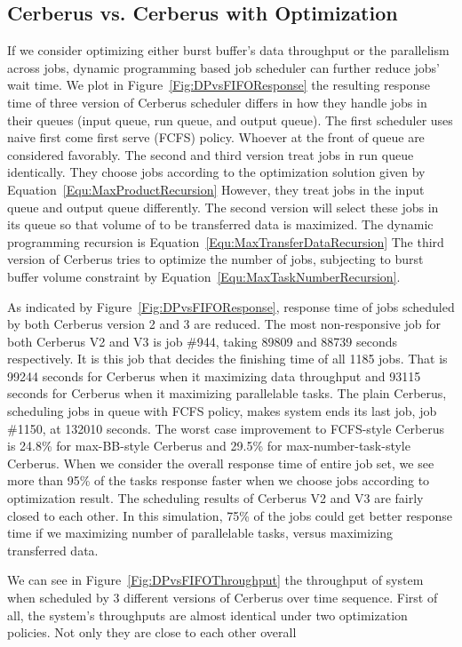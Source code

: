 \subsection{Cerberus vs. Cerberus with Optimization}
If we consider optimizing either burst buffer's data throughput or the parallelism across jobs,
dynamic programming based job scheduler can further reduce jobs' wait time.
We plot in Figure~\ref{Fig:DPvsFIFOResponse} the resulting response time of
three version of Cerberus scheduler differs in
how they handle jobs in their queues (input queue, run queue, and output queue).
The first scheduler uses naive first come first serve (FCFS) policy.
Whoever at the front of queue are considered favorably.
The second and third version treat jobs in run queue identically.
They choose jobs according to the optimization solution given by Equation~\ref{Equ:MaxProductRecursion}
However, they treat jobs in the input queue and output queue differently.
The second version will select these jobs in its queue so that
volume of to be transferred data is maximized.
The dynamic programming recursion is Equation~\ref{Equ:MaxTransferDataRecursion}
The third version of Cerberus tries to optimize the number of jobs,
subjecting to burst buffer volume constraint by Equation~\ref{Equ:MaxTaskNumberRecursion}.

As indicated by Figure~\ref{Fig:DPvsFIFOResponse}, response time of
jobs scheduled by both Cerberus version 2 and 3 are reduced.
The most non-responsive job for both Cerberus V2 and V3 is job \#944,
taking 89809 and 88739 seconds respectively.
It is this job that decides the finishing time of all 1185 jobs.
That is 99244 seconds for Cerberus when it maximizing data throughput
and 93115 seconds for Cerberus when it maximizing parallelable tasks.
The plain Cerberus, scheduling jobs in queue with FCFS policy,
makes system ends its last job, job \#1150, at 132010 seconds.
The worst case improvement to FCFS-style Cerberus is 24.8\% for max-BB-style Cerberus
and 29.5\% for max-number-task-style Cerberus.
When we consider the overall response time of entire job set,
we see more than 95\% of the tasks response faster when we choose jobs according to
optimization result.
The scheduling results of Cerberus V2 and V3 are fairly closed to each other.
In this simulation, 75\% of the jobs could get better response time
if we maximizing number of parallelable tasks,
versus maximizing transferred data.

We can see in Figure~\ref{Fig:DPvsFIFOThroughput} the throughput of system
when scheduled by 3 different versions of Cerberus over time sequence.
First of all, the system's throughputs are almost identical
under two optimization policies.
Not only they are close to each other overall 





